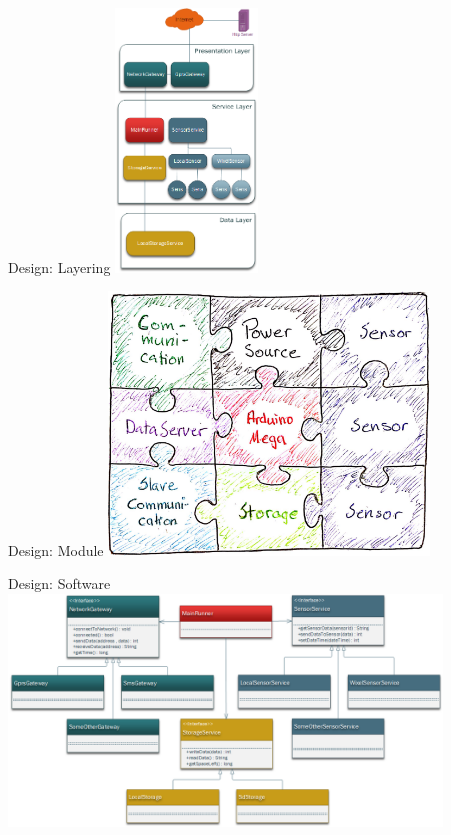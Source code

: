 \documentclass{beamer}
\begin{document}
\begin{frame}{Design: Layering}
\centering
\includegraphics[height=7cm]{graphics/Layering.png}
\end{frame}

\begin{frame}{Design: Module}
\centering
\includegraphics[height=7cm]{graphics/Puzzle.png}
\end{frame}

\begin{frame}{Design: Software}
\centering
\includegraphics[width=11.5cm]{graphics/ClassDiagram.png}
\end{frame}
\end{document}
